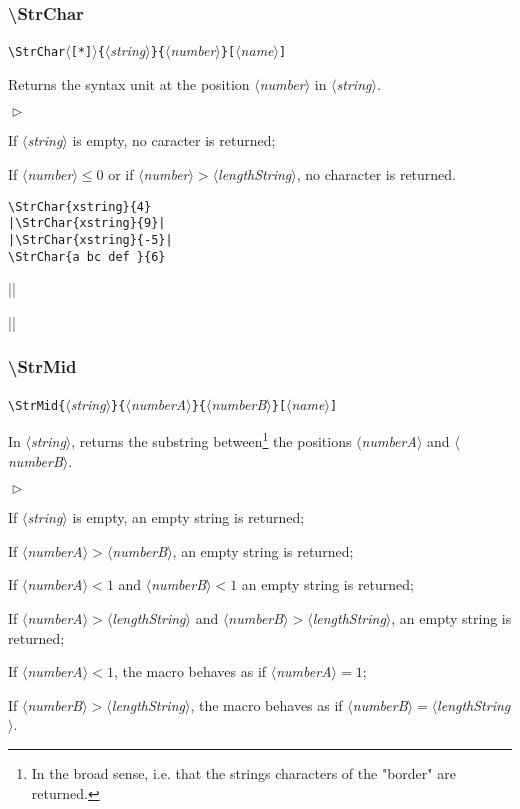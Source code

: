 \documentclass[a4paper,10pt]{article}
\newcommand\guill[1]{"#1"}
\newcommand\argu[1]{$\langle$\textit{#1}$\rangle$}
\newcommand\ARGU[1]{\texttt{\{}\argu{#1}\texttt{\}}}
\newcommand\arguC[1]{\texttt{[}\argu{#1}\texttt{]}}
\newcommand\etoile{$\langle$\texttt{[*]}$\rangle$}
\newenvironment{Conditions}[1][1cm]%
{\begin{list}%
	{$\vartriangleright$}%
	{\setlength{\leftmargin}{#1}
	 \setlength{\itemsep}{0pt}
	 \setlength{\parsep}{0pt}
	 \setlength{\topsep}{2ptplus3ptminus2pt}
	}}%
{\end{list}}
\newcommand\US{syntax unit\xspace}
\newcommand\styleexemple{\small\vskip4pt}
\newcommand\verbinline{\lstinline[basicstyle=\normalsize\ttfamily]}
\begin{document}
\subsubsection{\ttfamily\textbackslash StrChar}

\verbinline|\StrChar|\etoile\ARGU{string}\ARGU{number}\arguC{name}
\smallskip

Returns the \US at the position \argu{number} in \argu{string}.\medskip

\begin{Conditions}
\item If \argu{string} is empty, no caracter is returned;
\item If \argu{number}${}\leqslant0$ or if \argu{number}${}>{}$\argu{lengthString}, no character is returned.
\end{Conditions}

\begin{minipage}[t]{0.65\linewidth}
\begin{lstlisting}
\StrChar{xstring}{4}
|\StrChar{xstring}{9}|
|\StrChar{xstring}{-5}|
\StrChar{a bc def }{6}
\end{lstlisting}%
\end{minipage}\hfill
\begin{minipage}[t]{0.35\linewidth}
	\styleexemple
	\par
	||\par
	||\par
\end{minipage}%

\subsubsection{\ttfamily\textbackslash StrMid}

\verbinline|\StrMid|\ARGU{string}\ARGU{numberA}\ARGU{numberB}\arguC{name}
\smallskip

In \argu{string}, returns the substring between\footnote{In the broad sense, i.e. that the strings characters of the \guill{border} are returned.} the positions \argu{numberA} and \argu{numberB}.\medskip

\begin{Conditions}
\item If \argu{string} is empty, an empty string is returned;
\item If \argu{numberA}${}>{}$\argu{numberB}, an empty string is returned;
\item If \argu{numberA}${}<1$ and \argu{numberB}${}<1$ an empty string is returned;
\item If \argu{numberA}${}>{}$\argu{lengthString} and \argu{numberB}${}>{}$\argu{lengthString}, an empty string is returned;
\item If \argu{numberA}${}<1$, the macro behaves as if \argu{numberA}${}=1$;
\item If \argu{numberB}${}>{}$\argu{lengthString}, the macro behaves as if \argu{numberB}${}={}$\argu{lengthString}.
\end{Conditions}
\end{document}
